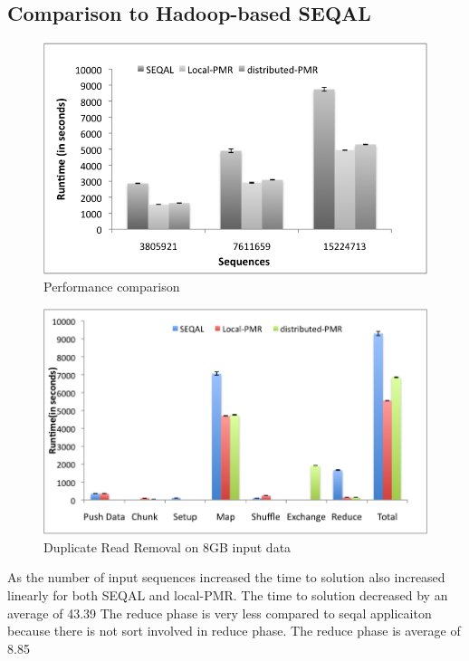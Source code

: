 \documentclass{sig-alternate}
\begin{document}
\subsection{Comparison to Hadoop-based SEQAL}


\begin{figure}
 \centering
\includegraphics[scale=0.55]{figures/seqalvslocalpmr.png}

\caption{\small Performance comparison}
  \label{fig:comp-pj-saga-mr vs SEQAL} 
\end{figure}

\begin{figure}
 \centering
\includegraphics[scale=0.55]{figures/8GB_phasewisetimes.png}

\caption{\small  Duplicate Read Removal on 8GB input data}
  \label{fig:comp-pj-saga-mr vs SEQAL} 
\end{figure}



As the number of input sequences increased the time to solution also increased linearly for both SEQAL and local-PMR. 
The time to solution decreased by an average of 43.39%
The reduce phase is very less compared to seqal applicaiton because there is not sort involved in reduce phase.
The reduce phase is average of 8.85%
\end{document}
